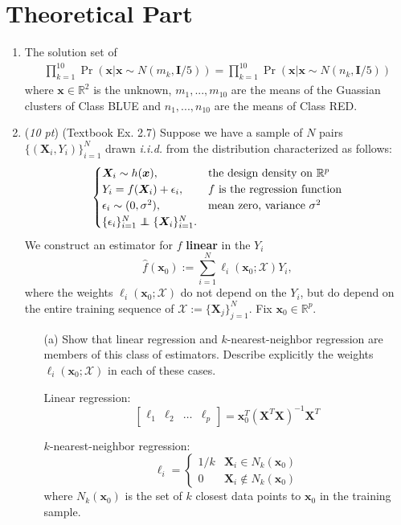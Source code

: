 \documentclass[10pt]{article}
\theoremstyle{definition}
\theoremstyle{remark}
\newcommand{\bx}{\bm{x}}
\newcommand{\Ib}{\mathbf{I}}
\newcommand{\Xb}{\mathbf{X}}
\newcommand{\bX}{\bm{X}}
\newcommand{\bbR}{\mathbb{R}}
\newcommand{\cX}{\mathcal{X}}
\newcommand\indep{\protect\mathpalette{\protect\independenT}{\perp}}
\def\independenT#1#2{\mathrel{\rlap{$#1#2$}\mkern2mu{#1#2}}}	%
\begin{document}
\section*{Theoretical Part}
\begin{enumerate}
	\item 

The solution set of 
\begin{gather*}
    \prod_{k=1}^{10} \Pr \left( \bx | \bx \sim N(m_k, \Ib / 5) \right) = \prod_{k=1}^{10} \Pr \left( \bx | \bx \sim N(n_k, \Ib / 5) \right)
\end{gather*}
where $\bx\in \mathbb{R}^2$ is the unknown, $m_1, ... ,m_{10}$ are the means of the Guassian clusters of Class BLUE and $n_1, ... ,n_{10}$ are the means of Class RED.

	
	\item (\textit{10 pt}) (Textbook Ex. 2.7) Suppose we have a sample of $ N $ pairs $ \{(\bX_{i},Y_{i})\}_{i=1}^{N} $ drawn \textit{i.i.d.} from the distribution characterized as follows:
	\[ \begin{cases}
	\bX_{i} \sim h(\bx), & \text{the design density on $ \bbR^{p} $}\\
	Y_{i} = f(\bX_{i}) + \epsilon_{i}, & \text{$ f $ is the regression function}\\
	\epsilon_{i} \sim (0,\sigma^{2}), & \text{mean zero, variance $ \sigma^{2} $}\\
	\{ \epsilon_{i} \}_{i=1}^{N} \indep \{ \bX_{i} \}_{i=1}^{N}.
	\end{cases} \]
	We construct an estimator for $ f $ \textbf{linear} in the $ Y_{i} $
	\[ \hat{f}(\bx_{0}) := \sum_{i=1}^{N}\ell_{i}(\bx_{0};\cX)Y_{i}, \]
	where the weights $ \ell_{i}(\bx_{0};\cX) $ do not depend on the $ Y_{i} $, but do depend on the entire training sequence of $ \cX := \{ \bX_{j} \}_{j=1}^{N} $. Fix $ \bx_{0} \in \bbR^{p} $.
	\begin{itemize}
		\item [(a)] Show that linear regression and $ k $-nearest-neighbor regression are members of this class of estimators. Describe explicitly the weights $ \ell_{i}(\bx_{0};\cX) $ in each of these cases.
		
		
		Linear regression:
		\[ \begin{bmatrix} 
		\ell_1 & \ell_2 & \hdots & \ell_p
		\end{bmatrix} = \bx_0^T(\Xb^T\Xb)^{-1} \Xb^T \]
		
		$ k $-nearest-neighbor regression:
		\[ \ell_i = \begin{cases}
		1/k & \bX_i \in N_k(\bx_0) \\
		0 & \bX_i \notin N_k(\bx_0)
		\end{cases} \]
		where $ N_k(\bx_0) $ is the set of $ k $ closest data points to $ \bx_0 $ in the training sample.
		

\end{itemize}
\end{enumerate}
\end{document}
